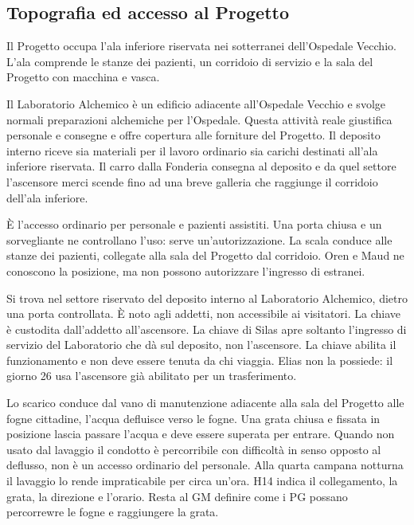\documentclass[11pt,a4paper]{article}
\begin{document}
\subsection{Topografia ed accesso al Progetto}
Il Progetto occupa l'ala inferiore riservata nei sotterranei dell'Ospedale Vecchio. L'ala comprende le stanze dei pazienti, un corridoio di servizio e la sala del Progetto con macchina e vasca.

Il Laboratorio Alchemico è un edificio adiacente all'Ospedale Vecchio e svolge normali preparazioni alchemiche per l'Ospedale. Questa attività reale giustifica personale e consegne e offre copertura alle forniture del Progetto. Il deposito interno riceve sia materiali per il lavoro ordinario sia carichi destinati all'ala inferiore riservata. Il carro dalla Fonderia consegna al deposito e da quel settore l'ascensore merci scende fino ad una breve galleria che raggiunge il corridoio dell'ala inferiore.

\begin{description}[leftmargin=5mm,style=nextline]
\item[Scala dell'Ospedale]
È l'accesso ordinario per personale e pazienti assistiti. Una porta chiusa e un sorvegliante ne controllano l'uso: serve un'autorizzazione. La scala conduce alle stanze dei pazienti, collegate alla sala del Progetto dal corridoio. Oren e Maud ne conoscono la posizione, ma non possono autorizzare l'ingresso di estranei.
\item[Ascensore del deposito.]
Si trova nel settore riservato del deposito interno al Laboratorio Alchemico, dietro una porta controllata. È noto agli addetti, non accessibile ai visitatori. La chiave è custodita dall'addetto all'ascensore. La chiave di Silas apre soltanto l'ingresso di servizio del Laboratorio che dà sul deposito, non l'ascensore. La chiave abilita il funzionamento e non deve essere tenuta da chi viaggia. Elias non la possiede: il giorno 26 usa l'ascensore già abilitato per un trasferimento.
\item[Scarico delle fogne.]
Lo scarico conduce dal vano di manutenzione adiacente alla sala del Progetto alle fogne cittadine, l'acqua defluisce verso le fogne. Una grata chiusa e fissata in posizione lascia passare l'acqua e deve essere superata per entrare. Quando non usato dal lavaggio il condotto è percorribile con difficoltà in senso opposto al deflusso, non è un accesso ordinario del personale. Alla quarta campana notturna il lavaggio lo rende impraticabile per circa un'ora. H14 indica il collegamento, la grata, la direzione e l'orario. Resta al GM definire come i PG possano percorrewre le fogne e raggiungere la grata.
\end{description}
\end{document}

